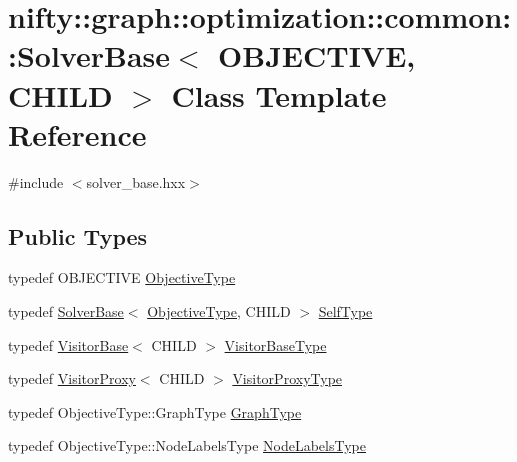 \hypertarget{classnifty_1_1graph_1_1optimization_1_1common_1_1SolverBase}{}\section{nifty\+:\+:graph\+:\+:optimization\+:\+:common\+:\+:Solver\+Base$<$ O\+B\+J\+E\+C\+T\+I\+V\+E, C\+H\+I\+L\+D $>$ Class Template Reference}
\label{classnifty_1_1graph_1_1optimization_1_1common_1_1SolverBase}


{\ttfamily \#include $<$solver\+\_\+base.\+hxx$>$}

\subsection*{Public Types}
\begin{DoxyCompactItemize}
\item 
typedef O\+B\+J\+E\+C\+T\+I\+V\+E \hyperlink{classnifty_1_1graph_1_1optimization_1_1common_1_1SolverBase_a28e77903302d3c14fa9fddb5d0a6214d}{Objective\+Type}
\item 
typedef \hyperlink{classnifty_1_1graph_1_1optimization_1_1common_1_1SolverBase}{Solver\+Base}$<$ \hyperlink{classnifty_1_1graph_1_1optimization_1_1common_1_1SolverBase_a28e77903302d3c14fa9fddb5d0a6214d}{Objective\+Type}, C\+H\+I\+L\+D $>$ \hyperlink{classnifty_1_1graph_1_1optimization_1_1common_1_1SolverBase_ae445fe93efdb410186debfa5a248dfad}{Self\+Type}
\item 
typedef \hyperlink{classnifty_1_1graph_1_1optimization_1_1common_1_1VisitorBase}{Visitor\+Base}$<$ C\+H\+I\+L\+D $>$ \hyperlink{classnifty_1_1graph_1_1optimization_1_1common_1_1SolverBase_a5a14d64c70a9cc0eebc7d71d2b089f9b}{Visitor\+Base\+Type}
\item 
typedef \hyperlink{classnifty_1_1graph_1_1optimization_1_1common_1_1VisitorProxy}{Visitor\+Proxy}$<$ C\+H\+I\+L\+D $>$ \hyperlink{classnifty_1_1graph_1_1optimization_1_1common_1_1SolverBase_a58913ea9ab9232ff72608b710c1012d0}{Visitor\+Proxy\+Type}
\item 
typedef Objective\+Type\+::\+Graph\+Type \hyperlink{classnifty_1_1graph_1_1optimization_1_1common_1_1SolverBase_a5b93d8c567c27949a944e908f59f8933}{Graph\+Type}
\item 
typedef Objective\+Type\+::\+Node\+Labels\+Type \hyperlink{classnifty_1_1graph_1_1optimization_1_1common_1_1SolverBase_a6e4e465f3b6e039882669fcfb9714818}{Node\+Labels\+Type}
\end{DoxyCompactItemize}
